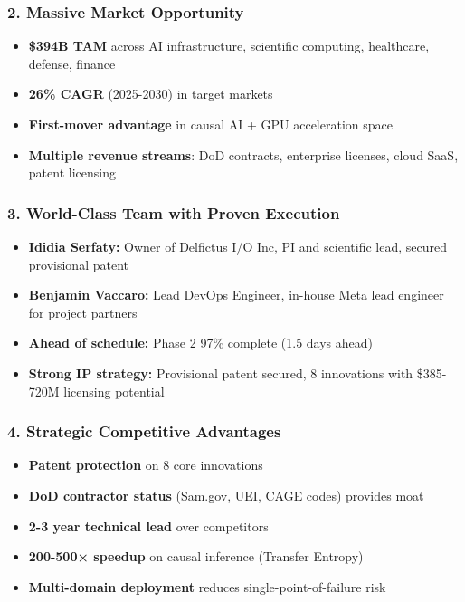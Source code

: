 \documentclass[11pt,letterpaper]{article}
\begin{document}
\subsubsection{2. Massive Market Opportunity}

\begin{itemize}
    \item \textbf{\$394B TAM} across AI infrastructure, scientific computing, healthcare, defense, finance
    \item \textbf{26\% CAGR} (2025-2030) in target markets
    \item \textbf{First-mover advantage} in causal AI + GPU acceleration space
    \item \textbf{Multiple revenue streams}: DoD contracts, enterprise licenses, cloud SaaS, patent licensing
\end{itemize}

\subsubsection{3. World-Class Team with Proven Execution}

\begin{itemize}
    \item \textbf{Ididia Serfaty:} Owner of Delfictus I/O Inc, PI and scientific lead, secured provisional patent
    \item \textbf{Benjamin Vaccaro:} Lead DevOps Engineer, in-house Meta lead engineer for project partners
    \item \textbf{Ahead of schedule:} Phase 2 97\% complete (1.5 days ahead)
    \item \textbf{Strong IP strategy:} Provisional patent secured, 8 innovations with \$385-720M licensing potential
\end{itemize}

\subsubsection{4. Strategic Competitive Advantages}

\begin{itemize}
    \item \textbf{Patent protection} on 8 core innovations
    \item \textbf{DoD contractor status} (Sam.gov, UEI, CAGE codes) provides moat
    \item \textbf{2-3 year technical lead} over competitors
    \item \textbf{200-500× speedup} on causal inference (Transfer Entropy)
    \item \textbf{Multi-domain deployment} reduces single-point-of-failure risk
\end{itemize}
\end{document}
